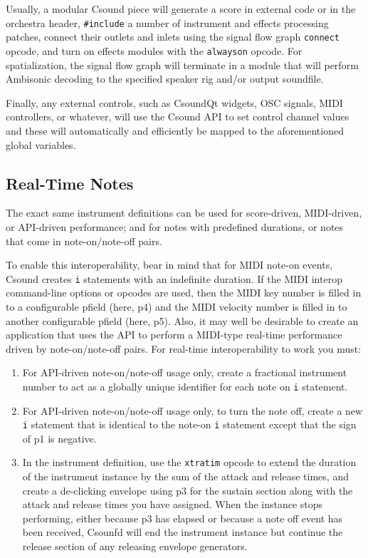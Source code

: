 \documentclass[12pt,letterpaper,onecolumn]{scrartcl}
\begin{document}
\begin{enumerate}
Usually, a modular Csound piece will generate a score in external code or in
the orchestra header, \texttt{\#include} a number of instrument and effects
processing patches, connect their outlets and inlets using the signal flow
graph \texttt{connect} opcode, and turn on effects modules with the
\texttt{alwayson} opcode. For spatialization, the signal flow graph will
terminate in a module that will perform Ambisonic decoding to the specified
speaker rig and/or output soundfile.

Finally, any external controls, such as CsoundQt widgets, OSC signals, MIDI
controllers, or whatever, will use the Csound API to set control channel values 
and these will automatically and efficiently be mapped to the aforementioned 
global variables.

\subsection{Real-Time Notes}

The exact same instrument definitions can be used for score-driven,
MIDI-driven, or API-driven performance; and for notes with predefined
durations, or notes that come in note-on/note-off pairs.

To enable this interoperability, bear in mind that for MIDI note-on events,
Csound creates \texttt{i} statements with an indefinite duration. If the MIDI
interop command-line options or opcodes are used, then the MIDI key number is
filled in to a configurable pfield (here, p4) and the MIDI velocity number is
filled in to another configurable pfield (here, p5). Also, it may well be
desirable to create an application that uses the API to perform a MIDI-type
real-time performance driven by note-on/note-off pairs. For real-time
interoperability to work you must:

\begin{enumerate}
    \item For API-driven note-on/note-off usage only, create a fractional
    instrument number to act as a globally unique identifier for each note on
\texttt{i} statement.
    \item For API-driven note-on/note-off usage only, to turn the note off,
    create a new \texttt{i} statement that is identical to the note-on
\texttt{i} statement except that the sign of p1 is negative.
    \item In the instrument definition, use the \texttt{xtratim} opcode to extend the
    duration of the instrument instance by the sum of the attack and release
    times, and create a de-clicking envelope using p3 for the sustain section along
    with the attack and release times you have assigned.
When the instance stops performing, either because p3 has elapsed or because a note
off event has been received, Csounfd will end the instrument instance but continue the
release section of any releasing envelope generators.
\end{enumerate}

\end{enumerate}
\end{document}
